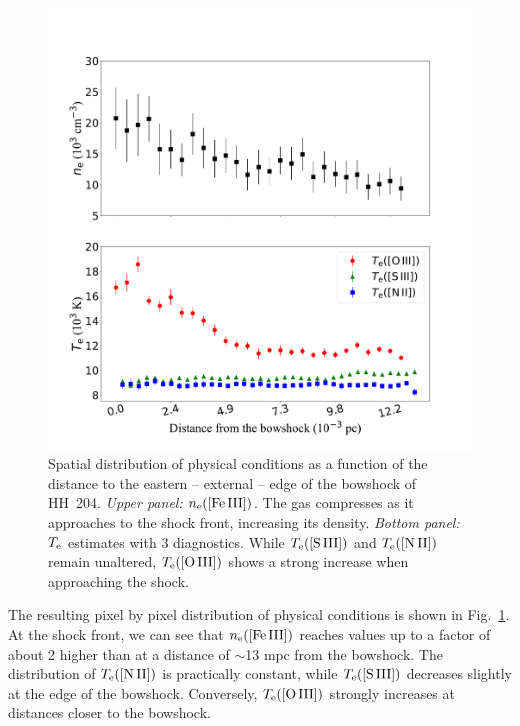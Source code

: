 \documentclass[twocolumn]{aastex63}
\begin{document}
\begin{figure}
\centering
\includegraphics[width=\columnwidth]{physical_conditions.pdf}
\caption{Spatial distribution of physical conditions as a function of the distance to the eastern -- external -- edge of the bowshock of HH~204. \textit{Upper panel:} $n_{\rm e}(\text{[Fe\thinspace III]})$. The gas compresses as it approaches to the shock front, increasing its density. \textit{Bottom panel:} $T_{\rm e}$ estimates with 3 diagnostics. While $T_{\rm e}(\text{[S\thinspace III]})$ and $T_{\rm e}(\text{[N\thinspace II]})$ remain unaltered, $T_{\rm e}(\text{[O\thinspace III]})$ shows a strong increase when approaching the shock. }
\label{fig:small_scale_physical_conditions}
\end{figure}



The resulting pixel by pixel distribution of physical conditions is shown in Fig.~\ref{fig:small_scale_physical_conditions}. At the shock front, we can see that $n_{\rm e}\text{([Fe\thinspace III])}$ reaches values up to a factor of about 2 higher than at a distance of $\sim$13$ \text{ mpc}$ from the bowshock. The distribution of $T_{\rm e}(\text{[N\thinspace II]})$ is practically constant, while $T_{\rm e}(\text{[S\thinspace III]})$ decreases slightly at the edge of the bowshock. Conversely, $T_{\rm e}(\text{[O\thinspace III]})$ strongly increases at distances closer to the bowshock. 
\end{document}
